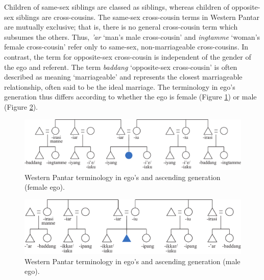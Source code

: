 Children of same-sex siblings are classed as siblings, whereas children of opposite-sex siblings are cross-cousins. The same-sex cross-cousin terms in Western Pantar are mutually exclusive; that is, there is no general cross-cousin term which subsumes the others. Thus, \textit{'ar} `man's male cross-cousin' and \textit{ingtamme} `woman's female cross-cousin' refer only to same-sex, non-marriageable cross-cousins. In contrast, the term for opposite-sex cross-cousin is independent of the gender of the ego and referent. The term \textit{baddang} `opposite-sex cross-cousin' is often described as meaning `marriageable' and represents the closest marriageable relationship, often said to be the ideal marriage. The terminology in ego's generation thus differs according to whether the ego is female (Figure \ref{fig:5:1}) or male (Figure \ref{fig:5:2}).

\begin{figure}
\includegraphics[width=\textwidth]{figures/Holton_ch5_fig1.pdf}
\caption{Western Pantar terminology in ego's and ascending generation (female ego). }
\label{fig:5:1}
\end{figure}  
 
\begin{figure}
\includegraphics[width=\textwidth]{figures/Holton_ch5_fig2.pdf}
\caption{Western Pantar terminology in ego's and ascending generation (male ego).}
\label{fig:5:2}
\end{figure} 
 

